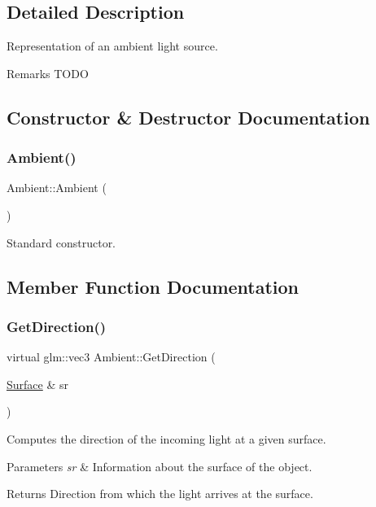 \subsection{Detailed Description}
Representation of an ambient light source. \begin{DoxyRemark}{Remarks}
T\+O\+DO 
\end{DoxyRemark}


\subsection{Constructor \& Destructor Documentation}
\hypertarget{class_ambient_a022e0d891287bc9bfc67a72e72a601d8}{}\label{class_ambient_a022e0d891287bc9bfc67a72e72a601d8} 
\subsubsection{\texorpdfstring{Ambient()}{Ambient()}}
{\footnotesize\ttfamily Ambient\+::\+Ambient (\begin{DoxyParamCaption}{ }\end{DoxyParamCaption})}

Standard constructor. 

\subsection{Member Function Documentation}
\hypertarget{class_ambient_acb2fc1574883ea0bd41c662ec904164f}{}\label{class_ambient_acb2fc1574883ea0bd41c662ec904164f} 
\subsubsection{\texorpdfstring{Get\+Direction()}{GetDirection()}}
{\footnotesize\ttfamily virtual glm\+::vec3 Ambient\+::\+Get\+Direction (\begin{DoxyParamCaption}\item[{\hyperlink{class_surface}{Surface} \&}]{sr }\end{DoxyParamCaption})\hspace{0.3cm}{\ttfamily [virtual]}}

Computes the direction of the incoming light at a given surface. 
\begin{DoxyParams}{Parameters}
{\em sr} & Information about the surface of the object. \\
\hline
\end{DoxyParams}
\begin{DoxyReturn}{Returns}
Direction from which the light arrives at the surface. 
\end{DoxyReturn}


